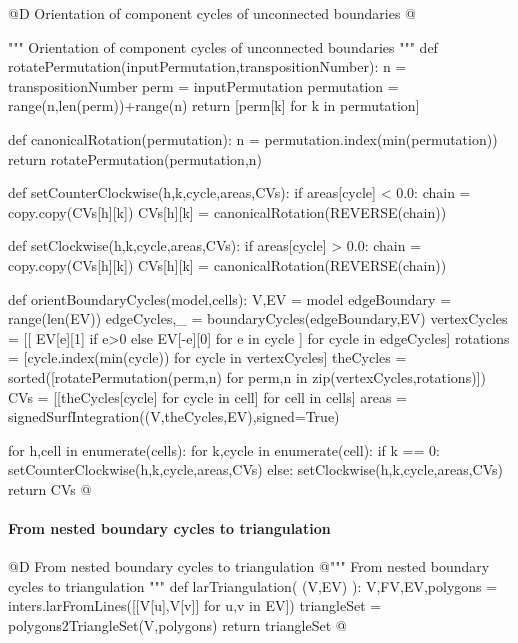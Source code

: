 \documentclass[11pt,oneside]{article}    %
\begin{document}
@D Orientation of component cycles of unconnected boundaries 
@{""" Orientation of component cycles of unconnected boundaries """
def rotatePermutation(inputPermutation,transpositionNumber):
    n = transpositionNumber
    perm = inputPermutation
    permutation = range(n,len(perm))+range(n) 
    return [perm[k] for k in permutation]

def canonicalRotation(permutation):
    n = permutation.index(min(permutation))
    return rotatePermutation(permutation,n)

def setCounterClockwise(h,k,cycle,areas,CVs):
    if areas[cycle] < 0.0: 
        chain = copy.copy(CVs[h][k])
        CVs[h][k] = canonicalRotation(REVERSE(chain))

def setClockwise(h,k,cycle,areas,CVs):
    if areas[cycle] > 0.0: 
        chain = copy.copy(CVs[h][k])
        CVs[h][k] = canonicalRotation(REVERSE(chain))

def orientBoundaryCycles(model,cells):
    V,EV = model
    edgeBoundary = range(len(EV))
    edgeCycles,_ = boundaryCycles(edgeBoundary,EV)
    vertexCycles = [[ EV[e][1] if e>0 else EV[-e][0] for e in cycle ] for cycle in edgeCycles]
    rotations = [cycle.index(min(cycle)) for cycle in vertexCycles]
    theCycles = sorted([rotatePermutation(perm,n) for perm,n in zip(vertexCycles,rotations)])
    CVs = [[theCycles[cycle] for cycle in cell] for cell in cells]
    areas = signedSurfIntegration((V,theCycles,EV),signed=True)
    
    for h,cell in enumerate(cells):
        for k,cycle in enumerate(cell):
            if k == 0: setCounterClockwise(h,k,cycle,areas,CVs)
            else: setClockwise(h,k,cycle,areas,CVs)
    return CVs
@}

\paragraph{From nested boundary cycles to triangulation}
@D From nested boundary cycles to triangulation 
@{""" From nested boundary cycles to triangulation """    
def larTriangulation( (V,EV) ):
    V,FV,EV,polygons = inters.larFromLines([[V[u],V[v]] for u,v in EV])
    triangleSet = polygons2TriangleSet(V,polygons)
    return triangleSet
@}
\end{document}
